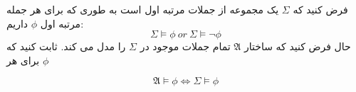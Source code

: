 فرض کنید که 
  $\Sigma$
  یک مجموعه از جملات مرتبه اول است به طوری که برای هر جمله مرتبه اول 
  $\phi$
  داریم: 
  \[\Sigma\models\phi \ or \ \Sigma\models\neg\phi\]
  حال فرض کنید که ساختار 
  $\mathfrak{A}$
  تمام جملات موجود در 
  $\Sigma$
  را مدل می کند. ثابت کنید که برای هر 
  $\phi$
  
  \[\mathfrak{A}\models\phi \iff \Sigma\models\phi\]
